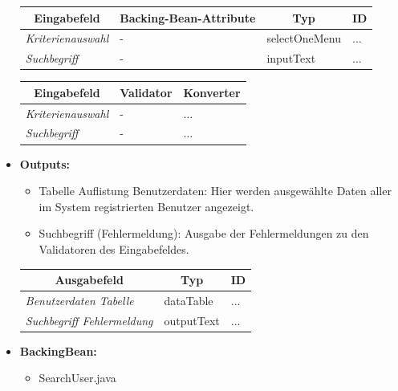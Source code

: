 \begin{itemize}
\begin{center}
\begin{longtable}{|p{3cm} |p{5cm} | p{4cm}|p{3cm}|}
						\hline \multicolumn{1}{|c|}{\textbf{Eingabefeld}} & \multicolumn{1}{|c|}{\textbf{Backing-Bean-Attribute}} & \multicolumn{1}{|c|}{\textbf{Typ}}  &  \multicolumn{1}{|c|}{\textbf{ID}} \\ \hline
						\endfirsthead
						\hline
						\endlastfoot
						\textit{Kriterienauswahl} & - & selectOneMenu & ... \\ \hline
						\textit{Suchbegriff} & - & inputText & ... \\ \hline
					\end{longtable}
				\end{center}
				
				\begin{center}
					\begin{longtable}{|p{3cm} |p{8cm} | p{5cm}|}
						
						\hline \multicolumn{1}{|c|}{\textbf{Eingabefeld}} & \multicolumn{1}{|c|}{\textbf{Validator}} & \multicolumn{1}{|c|}{\textbf{Konverter}} \\ \hline
						\endfirsthead
						\hline
						\endlastfoot
						\textit{Kriterienauswahl} & - & ... \\ \hline
						\textit{Suchbegriff} & - & ... \\ \hline
					\end{longtable}
				\end{center}
				
			\item \textbf{Outputs:}
				\begin{itemize}
					\item Tabelle Auflistung Benutzerdaten: Hier werden ausgewählte Daten aller im System registrierten Benutzer angezeigt.
					\item Suchbegriff (Fehlermeldung): Ausgabe der Fehlermeldungen zu den Validatoren des Eingabefeldes.
				\end{itemize}
				
					\begin{center}
						\begin{longtable}{|p{5cm} | p{4cm}|p{3cm}|}
							
							\hline \multicolumn{1}{|c|}{\textbf{Ausgabefeld}} & \multicolumn{1}{|c|}{\textbf{Typ}}  &  \multicolumn{1}{|c|}{\textbf{ID}} \\ \hline
							\endfirsthead
							\hline
							\endlastfoot
							\textit{Benutzerdaten Tabelle}  & dataTable & ... \\ \hline
							\textit{Suchbegriff Fehlermeldung}  & outputText & ... \\ \hline
						\end{longtable}
					\end{center}
				
			\item \textbf{BackingBean:}
				\begin{itemize}
					\item SearchUser.java
				\end{itemize}
		\end{itemize}
		
